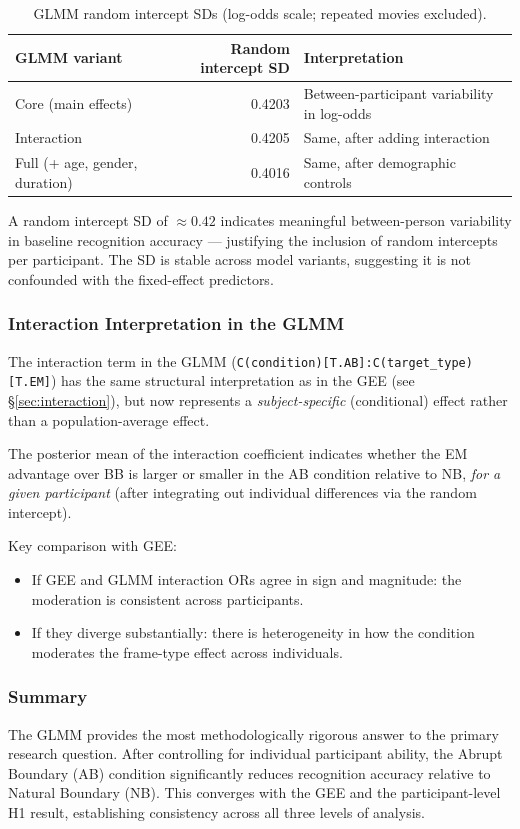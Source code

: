 \documentclass[12pt,a4paper]{article}
\begin{document}
\begin{table}[H]
\centering
\small
\begin{tabular}{lrp{5.5cm}}
\hline
\textbf{GLMM variant} & \textbf{Random intercept SD} & \textbf{Interpretation} \\
\hline
Core (main effects) & 0.4203 & Between-participant variability in log-odds \\
Interaction & 0.4205 & Same, after adding interaction \\
Full (+ age, gender, duration) & 0.4016 & Same, after demographic controls \\
\hline
\end{tabular}
\caption{GLMM random intercept SDs (log-odds scale; repeated movies excluded).}
\end{table}

\noindent A random intercept SD of $\approx 0.42$ indicates meaningful between-person
variability in baseline recognition accuracy --- justifying the inclusion of random intercepts
per participant. The SD is stable across model variants, suggesting it is not confounded
with the fixed-effect predictors.


\subsubsection{Interaction Interpretation in the GLMM}

The interaction term in the GLMM (\texttt{C(condition)[T.AB]:C(target\_type)[T.EM]})
has the same structural interpretation as in the GEE (see \S\ref{sec:interaction}), but now
represents a \emph{subject-specific} (conditional) effect rather than a population-average effect.

The posterior mean of the interaction coefficient indicates whether the EM advantage over BB
is larger or smaller in the AB condition relative to NB, \emph{for a given participant} (after
integrating out individual differences via the random intercept).

Key comparison with GEE:
\begin{itemize}[nosep]
  \item If GEE and GLMM interaction ORs agree in sign and magnitude: the moderation is consistent across participants.
  \item If they diverge substantially: there is heterogeneity in how the condition moderates the frame-type effect across individuals.
\end{itemize}

\subsubsection{Summary}
The GLMM provides the most methodologically rigorous answer to the primary research question.
After controlling for individual participant ability, the Abrupt Boundary (AB) condition
significantly reduces recognition accuracy relative to Natural Boundary (NB). This converges
with the GEE and the participant-level H1 result, establishing consistency across all three
levels of analysis.
\end{document}
